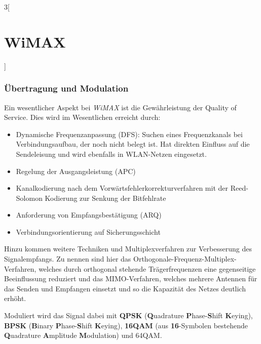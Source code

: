 \begin{multicols}{3}[\section{WiMAX}]
\subsubsection*{Übertragung und Modulation}
Ein wesentlicher Aspekt bei \textit{WiMAX} ist die Gewährleistung der Quality of Service. Dies wird im Wesentlichen erreicht durch:
\begin{itemize}
	\item Dynamische Frequenzanpassung (DFS): Suchen eines Frequenzkanals bei Verbindungsaufbau, der noch nicht belegt ist. Hat direkten Einfluss auf die Sendeleisung und wird ebenfalls in WLAN-Netzen eingesetzt.~\cite{wmx.13}
	\item Regelung der Ausgangsleistung (APC)
	\item Kanalkodierung nach dem Vorwärtsfehlerkorrekturverfahren mit der Reed-Solomon Kodierung zur Senkung der Bitfehlrate
	\item Anforderung von Empfangsbestätigung (ARQ)
	\item Verbindungsorientierung auf Sicherungsschicht
\end{itemize}
Hinzu kommen weitere Techniken und Multiplexverfahren zur Verbesserung des Signalempfangs. Zu nennen sind hier das Orthogonale-Frequenz-Multiplex-Verfahren, welches durch orthogonal stehende Trägerfrequenzen eine gegenseitige Beeinflussung reduziert und das MIMO-Verfahren, welches mehrere Antennen für das Senden und Empfangen einsetzt und so die Kapazität des Netzes deutlich erhöht.~\cite{wmx.12}

Moduliert wird das Signal dabei mit \textbf{QPSK} (\textbf{Q}uadrature \textbf{P}hase-\textbf{S}hift \textbf{K}eying), \textbf{BPSK} (\textbf{B}inary \textbf{P}hase-\textbf{S}hift \textbf{K}eying), \textbf{16QAM} (aus \textbf{16}-Symbolen bestehende \textbf{Q}uadrature \textbf{A}mplitude \textbf{M}odulation) und 64QAM.~\cite{wmx.2}


\end{multicols}
